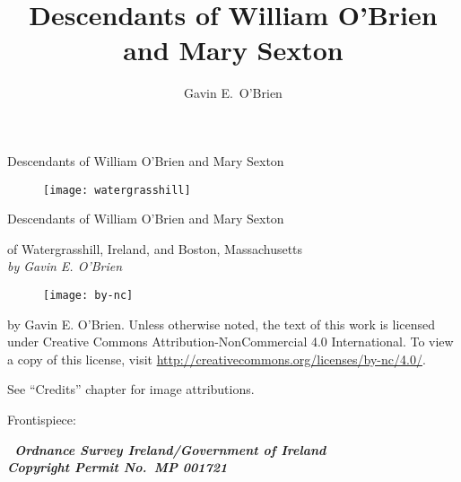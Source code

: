 \documentclass[ebook]{memoir}
\renewcommand{\bibname}{\chaptername\ \thechapter\ Citations}
\begin{document}
 	
\renewcommand{\bibsection}{%
	\section*{\bibname}
	\markright{\bibname}
}
 	
\frontmatter
\pagestyle{empty}

\author{Gavin E.\ O'Brien}
\title{Descendants of William O'Brien and Mary Sexton}

{\begingroup
\begin{Spacing}{1.75}
\centering
\vspace*{0.1\textheight}
{\Huge Descendants of William O'Brien and Mary Sexton}\\[\baselineskip]
\end{Spacing}
\endgroup}
\clearpage


\begin{figure}[p]
	\centering
	\texttt{[image: watergrasshill]}
\label{fig:frontispiece}
\end{figure}

\clearpage

{\begingroup%
	\centering
	\vspace*{0.1\textheight}
	\begin{Spacing}{1.75}{\Huge Descendants of William O'Brien and Mary Sexton}\end{Spacing}
	{\LARGE of Watergrasshill, Ireland, and Boston, Massachusetts}\\[\baselineskip]
	{\large\itshape by Gavin E. O'Brien}\\[\baselineskip]
	\vfill
	\endgroup}
\clearpage

\begingroup
\footnotesize
\parindent 0pt
\parskip \baselineskip
\vspace*{\fill}
\begin{figure}[h]
	\texttt{[image: by-nc]}
\end{figure}
 by Gavin E. O'Brien. Unless otherwise noted, the text of this work is licensed under Creative Commons Attribution-NonCommercial 4.0 International. To view a copy of this license, visit \url{http://creativecommons.org/licenses/by-nc/4.0/}.

See ``Credits'' chapter for image attributions.

Frontispiece:

{ 
\centering
\textbf{\textit{
		\textcopyright\ Ordnance Survey Ireland/Government of Ireland\\Copyright Permit No.\ MP 001721
	}}\par
}
	
\end{document}
